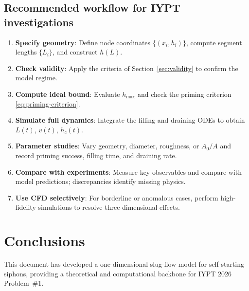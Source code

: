 \documentclass[11pt]{article}
\theoremstyle{definition}
\begin{document}
\subsection{Recommended workflow for IYPT investigations}

\begin{enumerate}[nosep]
  \item \textbf{Specify geometry}: Define node coordinates $\{(x_i, h_i)\}$, compute segment 
        lengths $\{L_i\}$, and construct $h(L)$.
  \item \textbf{Check validity}: Apply the criteria of Section~\ref{sec:validity} to confirm 
        the model regime.
  \item \textbf{Compute ideal bound}: Evaluate $h_{\max}$ and check the priming criterion 
        \eqref{eq:priming-criterion}.
  \item \textbf{Simulate full dynamics}: Integrate the filling and draining ODEs to obtain 
        $L(t)$, $v(t)$, $h_c(t)$.
  \item \textbf{Parameter studies}: Vary geometry, diameter, roughness, or $A_0/A$ and record 
        priming success, filling time, and draining rate.
  \item \textbf{Compare with experiments}: Measure key observables and compare with model 
        predictions; discrepancies identify missing physics.
  \item \textbf{Use CFD selectively}: For borderline or anomalous cases, perform 
        high-fidelity simulations to resolve three-dimensional effects.
\end{enumerate}

\section{Conclusions}
\label{sec:conclusions}

This document has developed a one-dimensional slug-flow model for self-starting siphons, 
providing a theoretical and computational backbone for IYPT 2026 Problem~\#1.
\end{document}

